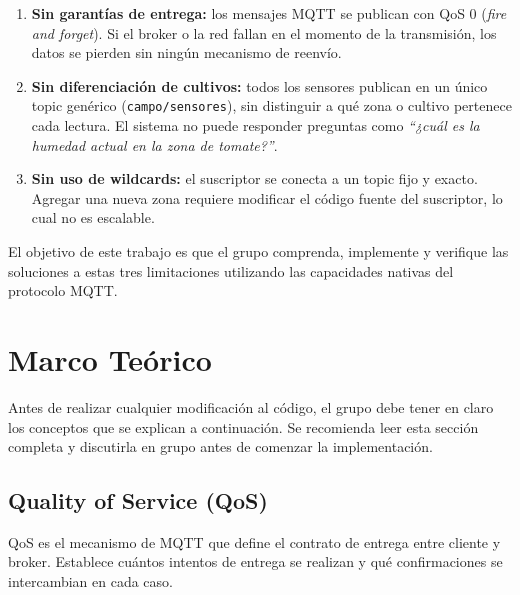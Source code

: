 \documentclass[12pt,a4paper]{article}
\begin{document}
\begin{enumerate}
  \item \textbf{Sin garantías de entrega:} los mensajes MQTT se publican con QoS 0
        (\textit{fire and forget}). Si el broker o la red fallan en el momento de
        la transmisión, los datos se pierden sin ningún mecanismo de reenvío.

  \item \textbf{Sin diferenciación de cultivos:} todos los sensores publican en un
        único topic genérico (\texttt{campo/sensores}), sin distinguir a qué zona
        o cultivo pertenece cada lectura. El sistema no puede responder preguntas
        como \textit{``¿cuál es la humedad actual en la zona de tomate?''}.

  \item \textbf{Sin uso de wildcards:} el suscriptor se conecta a un topic fijo y
        exacto. Agregar una nueva zona requiere modificar el código fuente del
        suscriptor, lo cual no es escalable.
\end{enumerate}

El objetivo de este trabajo es que el grupo comprenda, implemente y verifique
las soluciones a estas tres limitaciones utilizando las capacidades nativas
del protocolo MQTT.

\section{Marco Teórico}

Antes de realizar cualquier modificación al código, el grupo debe tener en claro
los conceptos que se explican a continuación. Se recomienda leer esta sección
completa y discutirla en grupo antes de comenzar la implementación.

\subsection{Quality of Service (QoS)}

QoS es el mecanismo de MQTT que define el contrato de entrega entre cliente
y broker. Establece cuántos intentos de entrega se realizan y qué confirmaciones
se intercambian en cada caso.
\end{document}
